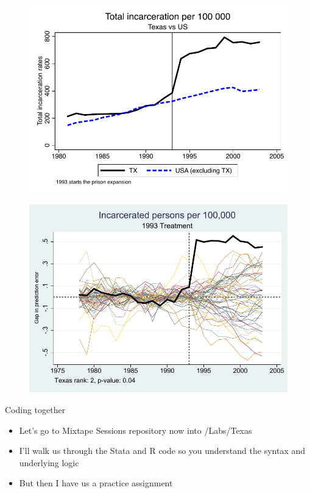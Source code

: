 \documentclass{beamer}
\begin{document}
\begin{frame}[shrink=30,plain]

\begin{figure}
\includegraphics{./lecture_includes/total_incarceration.pdf}
\end{figure}
\end{frame}

\begin{frame}[shrink=30,plain]

\begin{figure}
\includegraphics{./lecture_includes/synth_placebo_totalincarceration1993.pdf}
\end{figure}
\end{frame}


\begin{frame}{Coding together}

\begin{itemize}
\item Let's go to Mixtape Sessions repository now into /Labs/Texas 
\item I'll walk us through the Stata and R code so you understand the syntax and underlying logic
\item But then I have us a practice assignment 
\end{itemize}

\end{frame}
\end{document}
